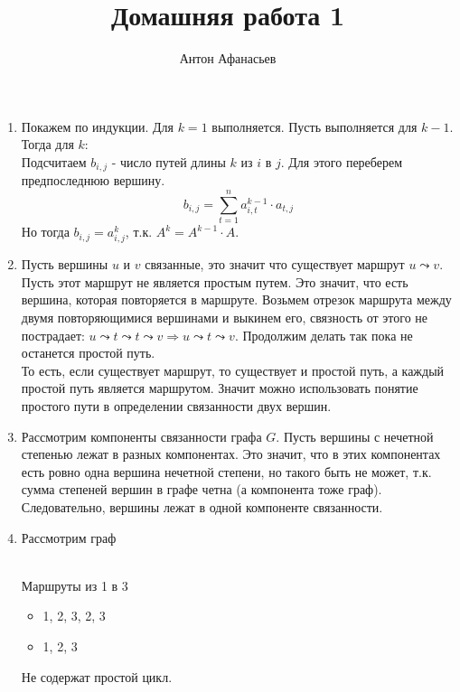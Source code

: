 \documentclass[10pt]{article}
\begin{document}
\title{Домашняя работа 1}
\author{Антон Афанасьев}
\maketitle

\begin{enumerate}
	\item Покажем по индукции. Для $k=1$ выполняется. Пусть выполняется для $k-1$. Тогда для $k$:\\
	Подсчитаем $b_{i,j}$ - число путей длины $k$ из $i$ в $j$. Для этого переберем предпоследнюю вершину.
	$$b_{i,j} = \sum_{t=1}^n a_{i,t}^{k-1} \cdot a_{t,j}$$ 
	Но тогда $b_{i,j} = a_{i,j}^k$, т.к. $A^k = A^{k-1} \cdot A$.

	\item Пусть вершины $u$ и $v$ связанные, это значит что существует маршрут $u \leadsto v$. Пусть этот маршрут не является простым путем. Это значит, что есть вершина, которая повторяется в маршруте. Возьмем отрезок маршрута между двумя повторяющимися вершинами и выкинем его, связность от этого не пострадает:
	$u \leadsto t \leadsto t \leadsto v \Rightarrow u \leadsto t \leadsto v$. Продолжим делать так пока не останется простой путь.\\
	То есть, если существует маршрут, то существует и простой путь, а каждый простой путь является маршрутом. Значит можно использовать понятие простого пути в определении связанности двух вершин.
	
	\item Рассмотрим компоненты связанности графа $G$. Пусть вершины с нечетной степенью лежат в разных компонентах. Это значит, что в этих компонентах есть ровно одна вершина нечетной степени, но такого быть не может, т.к. сумма степеней вершин в графе четна (а компонента тоже граф). Следовательно, вершины лежат в одной компоненте связанности.
	
	\item Рассмотрим граф \\
\\
	Маршруты из 1 в 3
	\begin{itemize}
		\item 1, 2, 3, 2, 3
		\item 1, 2, 3
	\end{itemize}
	Не содержат простой цикл.
	

\end{enumerate}
\end{document}
